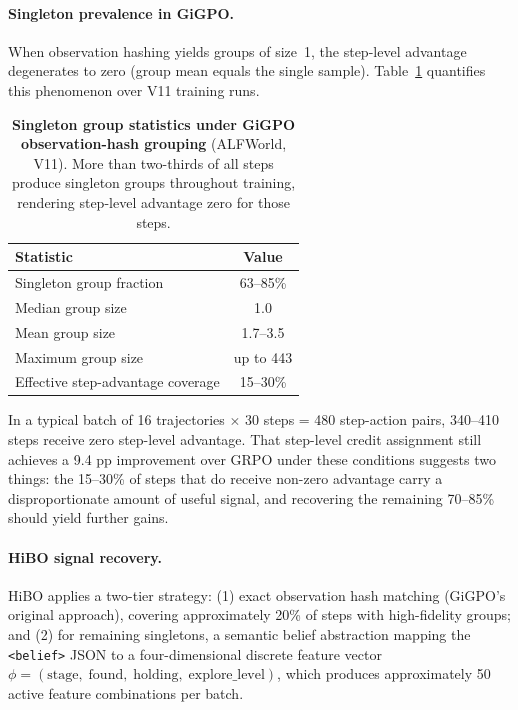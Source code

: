 \paragraph{Singleton prevalence in GiGPO.}
When observation hashing yields groups of size~1, the step-level advantage
degenerates to zero (group mean equals the single sample).
Table~\ref{tab:singleton} quantifies this phenomenon over V11 training runs.

\begin{table}[t]
  \centering
  \caption{%
    \textbf{Singleton group statistics under GiGPO observation-hash grouping}
    (ALFWorld, V11).
    More than two-thirds of all steps produce singleton groups throughout training,
    rendering step-level advantage zero for those steps.
  }
  \label{tab:singleton}
  \vspace{4pt}
  \small
  \renewcommand{\arraystretch}{1.15}
  \begin{tabular}{@{}lc@{}}
    \toprule
    \textbf{Statistic} & \textbf{Value} \\
    \midrule
    Singleton group fraction         & 63--85\%   \\
    Median group size                & 1.0        \\
    Mean group size                  & 1.7--3.5   \\
    Maximum group size               & up to 443  \\
    Effective step-advantage coverage & 15--30\%  \\
    \bottomrule
  \end{tabular}
\end{table}

In a typical batch of 16 trajectories $\times$ 30 steps = 480 step-action pairs,
340--410 steps receive zero step-level advantage.
That step-level credit assignment still achieves a 9.4 pp improvement over GRPO
under these conditions suggests two things: the 15--30\% of steps that do receive
non-zero advantage carry a disproportionate amount of useful signal, and recovering
the remaining 70--85\% should yield further gains.

\paragraph{HiBO signal recovery.}
HiBO applies a two-tier strategy:
(1) exact observation hash matching (GiGPO's original approach), covering
approximately 20\% of steps with high-fidelity groups; and
(2) for remaining singletons, a semantic belief abstraction mapping the
\texttt{<belief>} JSON to a four-dimensional discrete feature vector
$\phi = (\text{stage},\; \text{found},\; \text{holding},\; \text{explore\_level})$,
which produces approximately 50 active feature combinations per batch.

